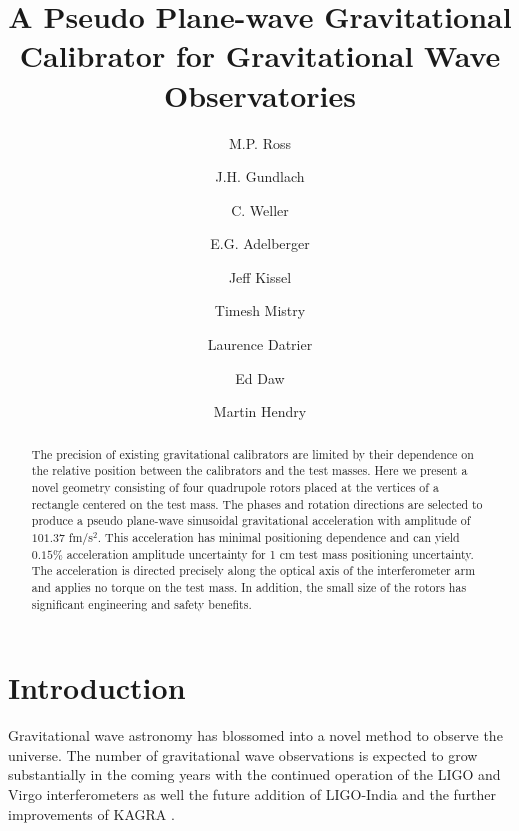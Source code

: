 \documentclass[superscriptaddress, twocolumn, prd]{revtex4-1}
\begin{document}
\title{A Pseudo Plane-wave Gravitational Calibrator for Gravitational Wave Observatories}

\author{M.P. Ross}
\author{J.H. Gundlach}
\author{C. Weller}
\author{E.G. Adelberger}
\author{Jeff Kissel}
\author{Timesh Mistry}
\author{Laurence Datrier}
\author{Ed Daw}
\author{Martin Hendry}



\begin{abstract}

 The precision of existing gravitational calibrators are limited by their dependence on the relative position between the calibrators and the test masses. Here we present a novel geometry consisting of four quadrupole rotors placed at the vertices of a rectangle centered on the test mass. The phases and rotation directions are selected to produce a pseudo plane-wave  sinusoidal gravitational acceleration with amplitude of $101.37$ fm/s$^2$. This acceleration has minimal positioning dependence and can yield $0.15 \%$ acceleration amplitude uncertainty for 1 cm test mass positioning uncertainty. The acceleration is directed precisely along the optical axis of the interferometer arm and applies no torque on the test mass. In addition, the small size of the rotors has significant engineering and safety benefits.

\end{abstract}

\maketitle

\section{Introduction}

Gravitational wave astronomy has blossomed into a novel method to observe the universe. The number of gravitational wave observations is expected to grow substantially in the coming years with the continued operation of the LIGO \cite{aLIGO} and Virgo \cite{virgo} interferometers as well the future addition of LIGO-India \cite{ligo-india} and the further improvements of KAGRA \cite{kagra}. 
\end{document}
